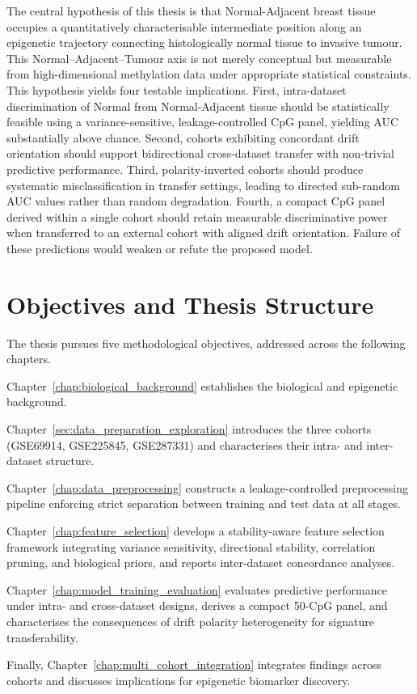 The central hypothesis of this thesis is that
Normal-Adjacent breast tissue occupies a
quantitatively characterisable intermediate
position along an epigenetic trajectory connecting
histologically normal tissue to invasive tumour.
This Normal--Adjacent--Tumour axis is not merely
conceptual but measurable from high-dimensional
methylation data under appropriate statistical constraints.
This hypothesis yields four testable implications.
First, intra-dataset discrimination of Normal from
Normal-Adjacent tissue should be statistically feasible
using a variance-sensitive, leakage-controlled CpG panel,
yielding AUC substantially above chance.
Second, cohorts exhibiting concordant drift orientation
should support bidirectional cross-dataset transfer
with non-trivial predictive performance.
Third, polarity-inverted cohorts should produce
systematic misclassification in transfer settings,
leading to directed sub-random AUC values rather
than random degradation.
Fourth, a compact CpG panel derived within a single
cohort should retain measurable discriminative power
when transferred to an external cohort with aligned
drift orientation. Failure of these predictions would weaken or refute
the proposed model.

\section{Objectives and Thesis Structure}

The thesis pursues five methodological objectives,
addressed across the following chapters.

Chapter~\ref{chap:biological_background} establishes
the biological and epigenetic background.

Chapter~\ref{sec:data_preparation_exploration} introduces
the three cohorts (GSE69914, GSE225845, GSE287331)
and characterises their intra- and inter-dataset structure.

Chapter~\ref{chap:data_preprocessing} constructs a
leakage-controlled preprocessing pipeline enforcing
strict separation between training and test data
at all stages.

Chapter~\ref{chap:feature_selection} develops a
stability-aware feature selection framework integrating
variance sensitivity, directional stability, correlation
pruning, and biological priors, and reports
inter-dataset concordance analyses.

Chapter~\ref{chap:model_training_evaluation} evaluates
predictive performance under intra- and cross-dataset
designs, derives a compact 50-CpG panel, and
characterises the consequences of drift polarity
heterogeneity for signature transferability.

Finally, Chapter~\ref{chap:multi_cohort_integration} integrates
findings across cohorts and discusses implications
for epigenetic biomarker discovery.